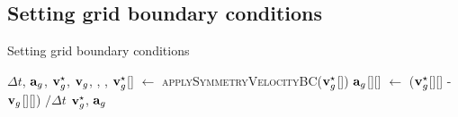 \subsection{Setting grid boundary conditions}
\begin{breakablealgorithm}
  \caption{Setting grid boundary conditions}
  \begin{algorithmic}[1]
    \Require $\Delta t$, $\mathbf{a}_g$, $\mathbf{v}_g^{\star}$, $\mathbf{v}_g$,
             , ,
        \State $\mathbf{v}_g^\star$[\TTmatl] $\leftarrow$ \textsc{applySymmetryVelocityBC}($\mathbf{v}_g^\star$[\TTmatl])
          \State $\mathbf{a}_g$[\TTmatl][\TTnode] $\leftarrow$ ($\mathbf{v}_g^\star$[\TTmatl][\TTnode] - $\mathbf{v}_g$[\TTmatl][\TTnode]) $/ \Delta t$
        \EndFor
      \EndFor
      \State \Return $\mathbf{v}_g^\star$, $\mathbf{a}_g$
    \EndProcedure
  \end{algorithmic}
\end{breakablealgorithm}

